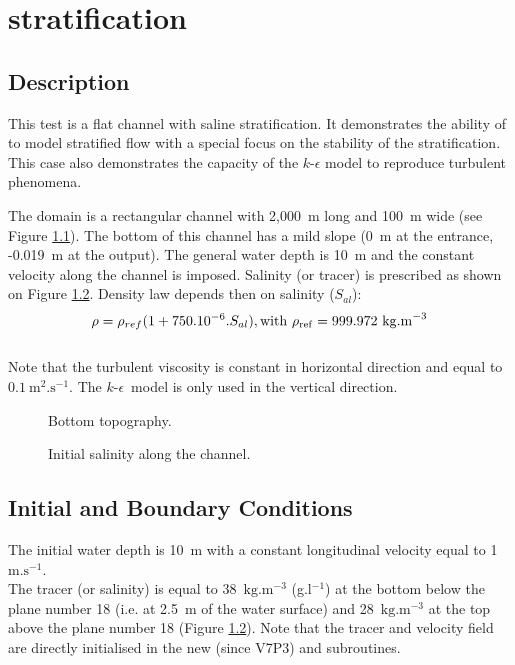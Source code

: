 \chapter{stratification}

%
\section{Description}
\bigskip
This test is a flat channel with saline stratification.
It demonstrates the ability of  to model stratified
flow with a special focus on the stability of the stratification.
This case also demonstrates the capacity of the $k$-$\epsilon$ model
to reproduce turbulent phenomena.

\bigskip
The domain is a rectangular channel with 2,000~m long and 100~m wide 
(see Figure \ref{t3d:stratification:fig:bathy}). The bottom of 
this channel has a mild slope (0~m at the entrance, -0.019~m at the output).
The general water depth is 10~m and the constant velocity 
along the channel is imposed. Salinity (or tracer) is prescribed 
as shown on Figure \ref{t3d:stratification:fig:salInit}.
Density law depends then on salinity ($S_{al}$):
\begin{equation*}
\rho = \rho_{ref} (1 + 750.10^{-6} . S_{al} ),
\rm{with }~\rho_{ref} = 999.972~\rm{kg.m}^{-3}
\end{equation*}
\\
Note that the turbulent viscosity is constant in horizontal direction
and equal to $0.1~\text{m}^2.\text{s}^{-1}$. The $k$-$\epsilon$~model 
is only used in the vertical direction. 

\begin{figure}[!htbp]
 \centering
 \caption{Bottom topography.}
 \label{t3d:stratification:fig:bathy}
\end{figure}
\begin{figure}[!htbp]
 \centering
 \caption{Initial salinity along the channel.}
 \label{t3d:stratification:fig:salInit}
\end{figure}
\section{Initial and Boundary Conditions}
\bigskip
The initial water depth is 10~m with a constant longitudinal 
velocity equal to 1~$\text{m}.\text{s}^{-1}$.\\
The tracer (or salinity) is equal to 38~$\text{kg}.\text{m}^{-3}$ (g.l$^{-1}$)
at the bottom below the plane number 18 
(i.e. at 2.5~m of the water surface) and 28~$\text{kg}.\text{m}^{-3}$ 
at the top above the plane number 18 
(Figure \ref{t3d:stratification:fig:salInit}).
Note that the tracer and velocity field are directly initialised in the
new (since V7P3)  and  subroutines.

